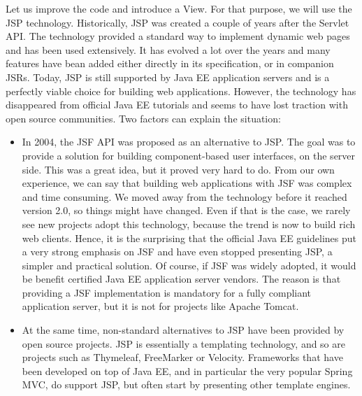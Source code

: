Let us improve the code and introduce a View. For that purpose, we will use the \ac{JSP} technology. Historically, JSP was created a couple of years after the Servlet API. The technology provided a standard way to implement dynamic web pages and has been used extensively. It has evolved a lot over the years and many features have bean added either directly in its specification, or in companion \ac{JSR}s. Today, JSP is still supported by Java EE application servers and is a perfectly viable choice for building web applications. However, the technology has disappeared from official Java EE tutorials and seems to have lost traction with open source communities. Two factors can explain the situation:


\begin{itemize}
\item In 2004, the \ac{JSF} API was proposed as an alternative to JSP. The goal was to provide a solution for building component-based user interfaces, on the server side. This was a great idea, but it proved very hard to do. From our own experience, we can say that building web applications with \ac{JSF} was complex and time consuming. We moved away from the technology before it reached version 2.0, so things might have changed. Even if that is the case, we rarely see new projects adopt this technology, because the trend is now to build rich web clients. Hence, it is the surprising that the official Java EE guidelines put a very strong emphasis on \ac{JSF} and have even stopped presenting \ac{JSP}, a simpler and practical solution. Of course, if \ac{JSF} was widely adopted, it would be benefit certified Java EE application server vendors. The reason is that providing a \ac{JSF} implementation is mandatory for a fully compliant application server, but it is not for projects like Apache Tomcat.
\item At the same time, non-standard alternatives to \ac{JSP} have been provided by open source projects. \ac{JSP} is essentially a templating technology, and so are projects such as Thymeleaf, FreeMarker or Velocity. Frameworks that have been developed on top of Java EE, and in particular the very popular Spring MVC, do support \ac{JSP}, but often start by presenting other template engines.
\end{itemize}

